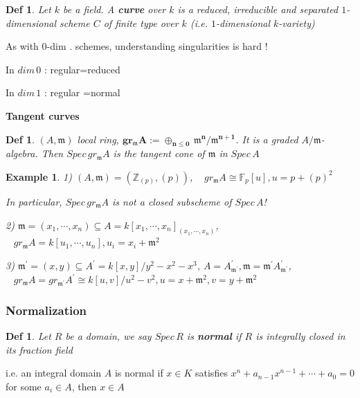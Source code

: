 \documentclass{article}
\newtheorem{definition}[theorem]{Def}
\newtheorem{example}[theorem]{Example}
\begin{document}
\begin{definition}
Let $k$ be a field. A \textbf{curve} over $k$ is a reduced, irreducible and separated $1$-dimensional scheme
$C$ of finite type over $k$ (i.e. $1$-dimensional
$k$-variety)
\end{definition}

As with $0$-dim . schemes, understanding
singularities is hard !

In $dim\,0$ :
regular=reduced

In $dim\,1$ : regular =normal

\textbf{Tangent curves}

\begin{definition}
    $(A,\mathfrak m)$ local ring, $\bm{gr_\mathfrak mA:= \oplus_{n\leq 0}\,\mathfrak m^n/\mathfrak m^{n+1}}$. It is a graded $A/\mathfrak m$-algebra. Then $Spec\,gr_\mathfrak m A$ is the tangent cone of $\mathfrak m$ in $Spec\,A$
\end{definition}

\begin{example}
    1) $(A,\mathfrak m)=(\mathbb Z_{(p)},(p))$, $\;\;\;gr_\mathfrak mA\cong \mathbb F_p[u],u=p+(p)^2$

In particular, $Spec\,gr_\mathfrak m A$ is not a closed
subscheme of $Spec\,A$!

    2) $\mathfrak m=(x_1,\cdots,x_n) \subseteq A=k[x_1,\cdots,x_n]_{(x_1,\cdots,x_n)}$, $\;\;\;gr_\mathfrak m A=k[u_1,\cdots,u_n],u_i=x_i+\mathfrak m^2$

    3) $\mathfrak m^\prime=(x,y) \subseteq A^\prime=k[x,y]/y^2-x^2-x^3$, $A=A^\prime_{\mathfrak m^\prime},\mathfrak m=\mathfrak m^\prime A^\prime_{\mathfrak m^\prime}$,
    $\;\;\;gr_\mathfrak m A= gr_{\mathfrak m^\prime} A^\prime \cong k[u,v]/u^2-v^2,u=x+\mathfrak m^2,v=y+\mathfrak m^2$
\end{example}

\subsubsection{Normalization}

\begin{definition}
    Let $R$ be a domain, we say $Spec\,R$ is \textbf{normal} if $R$ is integrally closed in its fraction field 
\end{definition}

i.e. an integral domain $A$ is normal if $x \in K$
satisfies $x^n + a_{n-1}x^{n-1} + \cdots + a_0 = 0$ for some $a_i \in A$, then $x \in A$
\end{document}
